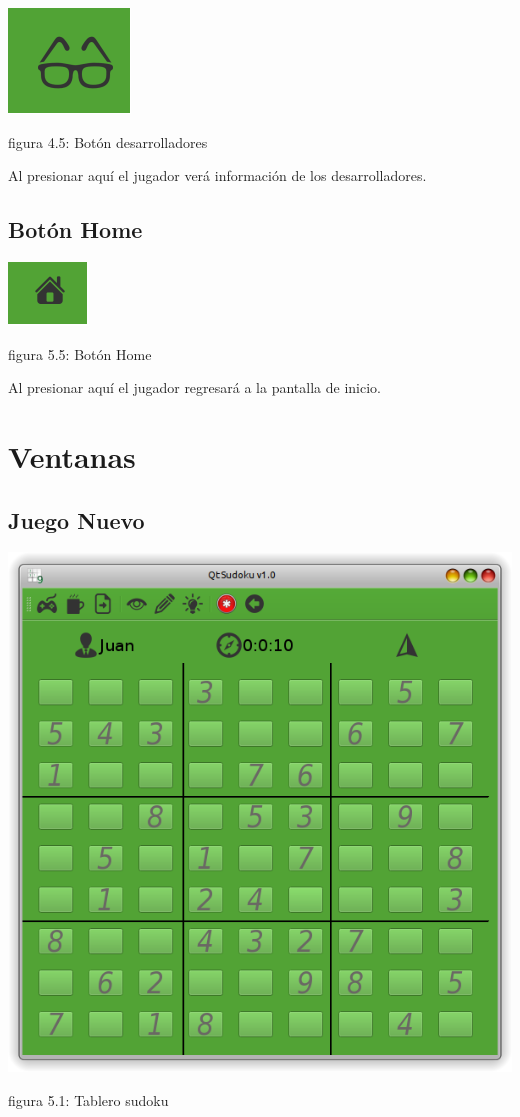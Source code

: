 \documentclass[a4paper,11pt]{article}
\begin{document}
{{\centerline{\includegraphics{develoICO.png}}
\centerline{figura 4.5: Botón desarrolladores}

Al presionar aquí el jugador verá información de los desarrolladores.

\subsection{Botón Home}

\centerline{\includegraphics{home.png}}
\centerline{figura 5.5: Botón Home }

Al presionar aquí el jugador regresará a la pantalla de inicio.

\section{Ventanas}


\subsection{Juego Nuevo}

\centerline{\includegraphics{tablero.png}}
\centerline{figura 5.1: Tablero sudoku}
}}
\end{document}
